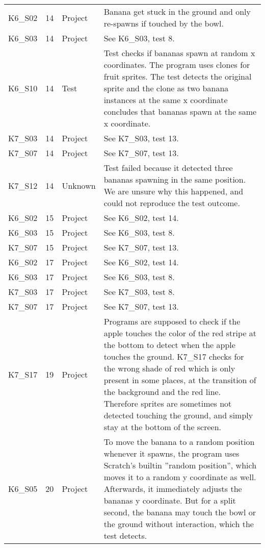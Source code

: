 \begin{table}[htpb]
\begin{tabular}{lrlp{10.5cm}}
        K6\_S02 & 14   & Project & Banana get stuck in the ground and only re-spawns if touched by the bowl. \\
        K6\_S03 & 14   & Project & See K6\_S03, test 8. \\
        K6\_S10 & 14   & Test    & Test checks if bananas spawn at random x coordinates.
                                   The program uses clones for fruit sprites.
                                   The test detects the original sprite and the clone as two banana instances at the same x coordinate concludes that bananas spawn at the same x coordinate. \\
        K7\_S03 & 14   & Project & See K7\_S03, test 13. \\
        K7\_S07 & 14   & Project & See K7\_S07, test 13. \\
        K7\_S12 & 14   & Unknown & Test failed because it detected three bananas spawning in the same position.
                                   We are unsure why this happened, and could not reproduce the test outcome. \\

        K6\_S02 & 15   & Project & See K6\_S02, test 14. \\
        K6\_S03 & 15   & Project & See K6\_S03, test 8. \\
        K7\_S07 & 15   & Project & See K7\_S07, test 13. \\

        K6\_S02 & 17   & Project & See K6\_S02, test 14. \\
        K6\_S03 & 17   & Project & See K6\_S03, test 8. \\
        K7\_S03 & 17   & Project & See K7\_S03, test 8. \\
        K7\_S07 & 17   & Project & See K7\_S07, test 13. \\

        K7\_S17 & 19   & Project & Programs are supposed to check if the apple touches the color of the red stripe at the bottom to detect when the apple touches the ground.
                                   K7\_S17 checks for the wrong shade of red which is only present in some places, at the transition of the background and the red line.
                                   Therefore sprites are sometimes not detected touching the ground, and simply stay at the bottom of the screen. \\

        K6\_S05 & 20   & Project & To move the banana to a random position whenever it spawns,
                                   the program uses Scratch's builtin ''random position'', which moves it to a random y coordinate as well.
                                   Afterwards, it immediately adjusts the bananas y coordinate.
                                   But for a split second, the banana may touch the bowl or the ground without interaction, which the test detects. \\


\end{tabular}
\end{table}
